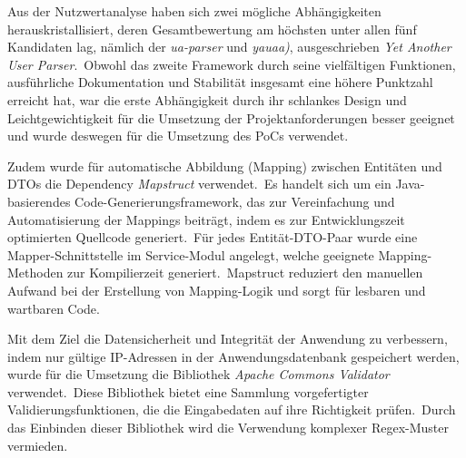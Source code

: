 Aus der Nutzwertanalyse haben sich zwei mögliche Abhängigkeiten herauskristallisiert, deren Gesamtbewertung am höchsten unter allen fünf Kandidaten lag, nämlich der \textit{ua-parser}  und \textit{yauaa)}, ausgeschrieben
\textit{Yet Another User Parser}.\ Obwohl das zweite Framework durch seine vielfältigen Funktionen, ausführliche Dokumentation und Stabilität insgesamt eine höhere Punktzahl erreicht hat, war die erste Abhängigkeit durch ihr schlankes Design und Leichtgewichtigkeit
für die Umsetzung der Projektanforderungen besser geeignet und wurde deswegen für die Umsetzung des PoCs verwendet.

Zudem wurde für automatische Abbildung (Mapping) zwischen Entitäten und DTOs die Dependency \textit{Mapstruct} verwendet.\ Es handelt sich um ein Java-basierendes Code-Generierungsframework, das zur Vereinfachung und Automatisierung der Mappings
beiträgt, indem es zur Entwicklungszeit optimierten Quellcode generiert.\ Für jedes Entität-DTO-Paar wurde eine Mapper-Schnittstelle im Service-Modul angelegt, welche geeignete Mapping-Methoden zur Kompilierzeit generiert.\ Mapstruct reduziert
den manuellen Aufwand bei der Erstellung von Mapping-Logik und sorgt für lesbaren und wartbaren Code.

Mit dem Ziel die Datensicherheit und Integrität der Anwendung zu verbessern, indem nur gültige IP-Adressen in der Anwendungsdatenbank gespeichert werden, wurde für die Umsetzung die Bibliothek \textit{Apache Commons Validator} verwendet.\ Diese Bibliothek bietet
eine Sammlung vorgefertigter Validierungsfunktionen, die die Eingabedaten auf ihre Richtigkeit prüfen.\ Durch das Einbinden dieser Bibliothek wird die Verwendung komplexer Regex-Muster vermieden.

